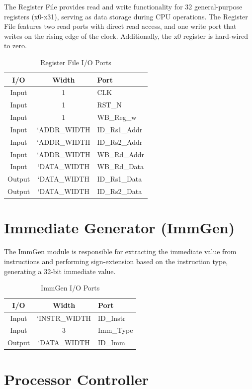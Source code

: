 \documentclass[12pt,a4paper]{report}
\begin{document}
The Register File provides read and write functionality for 32 general-purpose registers (x0-x31), serving as data storage during CPU operations. The Register File features two read ports with direct read access, and one write port that writes on the rising edge of the clock. Additionally, the x0 register is hard-wired to zero.

\begin{table}[htbp]
\centering
\caption{Register File I/O Ports}
\begin{tabular}{|c|c|l|}
\hline
\textbf{I/O} & \textbf{Width} & \textbf{Port} \\
\hline
Input & 1 & CLK \\
Input & 1 & RST\_N \\
Input & 1 & WB\_Reg\_w \\
Input & `ADDR\_WIDTH & ID\_Rs1\_Addr \\
Input & `ADDR\_WIDTH & ID\_Rs2\_Addr \\
Input & `ADDR\_WIDTH & WB\_Rd\_Addr \\
Input & `DATA\_WIDTH & WB\_Rd\_Data \\
Output & `DATA\_WIDTH & ID\_Rs1\_Data \\
Output & `DATA\_WIDTH & ID\_Rs2\_Data \\
\hline
\end{tabular}
\end{table}

\newpage
\section{Immediate Generator (ImmGen)}

The ImmGen module is responsible for extracting the immediate value from instructions and performing sign-extension based on the instruction type, generating a 32-bit immediate value.

\begin{table}[htbp]
\centering
\caption{ImmGen I/O Ports}
\begin{tabular}{|c|c|l|}
\hline
\textbf{I/O} & \textbf{Width} & \textbf{Port} \\
\hline
Input & `INSTR\_WIDTH & ID\_Instr \\
Input & 3 & Imm\_Type \\
Output & `DATA\_WIDTH & ID\_Imm \\
\hline
\end{tabular}
\end{table}

\section{Processor Controller}
\end{document}
